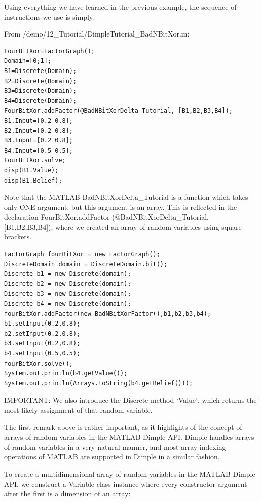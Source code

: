 \fi

Using everything we have learned in the previous example, the sequence of instructions we use is simply:

\ifmatlab 

From /demo/12\_Tutorial/DimpleTutorial\_BadNBitXor.m:


\begin{lstlisting}
FourBitXor=FactorGraph();
Domain=[0;1];
B1=Discrete(Domain);
B2=Discrete(Domain);
B3=Discrete(Domain);
B4=Discrete(Domain);
FourBitXor.addFactor(@BadNBitXorDelta_Tutorial, [B1,B2,B3,B4]);
B1.Input=[0.2 0.8];
B2.Input=[0.2 0.8];
B3.Input=[0.2 0.8];
B4.Input=[0.5 0.5];
FourBitXor.solve;
disp(B1.Value);
disp(B1.Belief);
\end{lstlisting}

Note that the MATLAB BadNBitXorDelta\_Tutorial is a function which takes only ONE argument, but this argument is an array. This is reflected in the declaration FourBitXor.addFactor (@BadNBitXorDelta\_Tutorial, [B1,B2,B3,B4]), where we created an array of random variables using square brackets.

\fi

\ifjava

\begin{lstlisting}
FactorGraph fourBitXor = new FactorGraph();
DiscreteDomain domain = DiscreteDomain.bit();
Discrete b1 = new Discrete(domain);
Discrete b2 = new Discrete(domain);
Discrete b3 = new Discrete(domain);
Discrete b4 = new Discrete(domain);
fourBitXor.addFactor(new BadNBitXorFactor(),b1,b2,b3,b4);
b1.setInput(0.2,0.8);
b2.setInput(0.2,0.8);
b3.setInput(0.2,0.8);
b4.setInput(0.5,0.5);
fourBitXor.solve();
System.out.println(b4.getValue());
System.out.println(Arrays.toString(b4.getBelief()));
\end{lstlisting}

\fi


IMPORTANT: We also introduce the Discrete method `Value', which returns the most likely assignment of that random variable.

\ifmatlab

The first remark above is rather important, as it highlights of the concept of arrays of random variables in the MATLAB Dimple API.  Dimple handles arrays of random variables in a very natural manner, and most array indexing operations of MATLAB are supported in Dimple in a similar fashion. 

To create a multidimensional array of random variables in the MATLAB Dimple API, we construct a Variable class instance where every constructor argument after the first is a dimension of an array:

